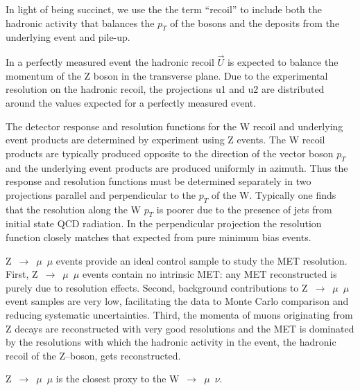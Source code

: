 In light of being succinct, we use the the term “recoil” to include both the hadronic activity that balances the $p_{T}$ of the bosons and the deposits from the underlying event and pile-up.

In a perfectly measured event the hadronic recoil $\vec{U}$  is expected to balance the momentum of the Z boson in the transverse plane.
Due to the experimental resolution on the hadronic recoil, the projections u1 and u2 are distributed around the values expected
for a perfectly measured event.

The detector response and resolution functions for the W recoil and underlying event products are determined by experiment using Z events.
The W recoil products are typically produced opposite to the direction of the vector boson $p_{T}$ and the underlying event products are produced uniformly in azimuth. Thus the response and resolution functions must be determined separately in two projections parallel and perpendicular to the $p_{T}$ of the W. Typically one finds that the resolution along the W $p_{T}$ is poorer due to the presence of jets from initial state QCD radiation. In the perpendicular projection the resolution function closely matches that expected from pure minimum bias events.

Z~$\rightarrow$~$\mu$~$\mu$ events provide an ideal control sample to study the MET resolution. First,
Z~$\rightarrow$~$\mu$~$\mu$ events contain no intrinsic MET: any MET reconstructed is purely due to resolution effects.
Second, background contributions to Z~$\rightarrow$~$\mu$~$\mu$ event samples are very low, facilitating the data to
Monte Carlo comparison and reducing systematic uncertainties.
Third, the momenta of muons originating from Z decays are reconstructed with very good resolutions and the MET is dominated by the resolutions with which the hadronic activity in the event, the hadronic recoil of the Z–boson, gets reconstructed.

Z~$\rightarrow$~$\mu$~$\mu$ is the closest proxy to the W~$\rightarrow$~$\mu$~$\nu$.
{\color{magenta}{HERE SAY THAT THE MASS TOPOLOGY IS SIMILAR and ALSO THE SCALE,For example, the uparall and uperp can be clearly defined in both topology.}}

\newpage 

